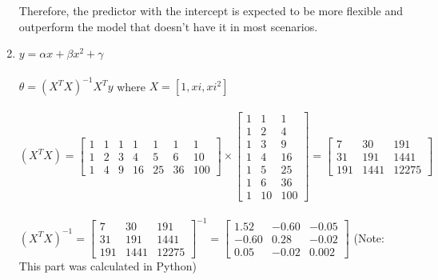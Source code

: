 \documentclass{assignment}
\begin{document}
\begin{problem}
\begin{enumerate}[label=\alph*)]
    Therefore, the predictor with the intercept is expected to be more flexible and outperform the model that doesn't have it in most scenarios.\\

    \item 
    $y = \alpha x + \beta x^2 + \gamma$\\\\
    $\theta = (X^TX)^{-1} X^Ty$ where $X=[1, xi, xi^2]$\\\\
    $(X^TX) = \begin{bmatrix}
        1&1&1&1&1&1&1\\
        1&2&3&4&5&6&10\\
        1&4&9&16&25&36&100
    \end{bmatrix} \times \begin{bmatrix}
        1&1&1\\1&2&4\\1&3&9\\
        1&4&16\\1&5&25\\1&6&36\\
        1&10&100
        \end{bmatrix}  = \begin{bmatrix}
            7&30&191\\
            31&191&1441\\
            191&1441&12275
    \end{bmatrix}$\\\\

    $(X^TX)^{-1} =  \begin{bmatrix}
            7&30&191\\
            31&191&1441\\
            191&1441&12275
    \end{bmatrix}^{-1} = \begin{bmatrix}
        1.52&-0.60&-0.05\\
        -0.60&0.28&-0.02\\
        0.05&-0.02&0.002
    \end{bmatrix}$ (Note: This part was calculated in Python)\\


\end{enumerate}
\end{problem}
\end{document}
